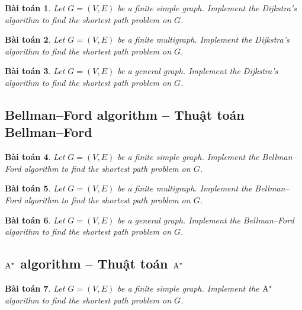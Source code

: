 \documentclass{article}
\newtheorem{baitoan}{Bài toán}
\begin{document}
\begin{baitoan}
    Let $G = (V,E)$ be a finite simple graph. Implement the Dijkstra's algorithm to find the shortest path problem on $G$.
\end{baitoan}

\begin{baitoan}
    Let $G = (V,E)$ be a finite multigraph. Implement the Dijkstra's algorithm to find the shortest path problem on $G$.
\end{baitoan}

\begin{baitoan}
    Let $G = (V,E)$ be a general graph. Implement the Dijkstra's algorithm to find the shortest path problem on $G$.
\end{baitoan}


\subsection{Bellman--Ford algorithm -- Thuật toán Bellman--Ford}

\begin{baitoan}
    Let $G = (V,E)$ be a finite simple graph. Implement the Bellman--Ford algorithm to find the shortest path problem on $G$.
\end{baitoan}

\begin{baitoan}
    Let $G = (V,E)$ be a finite multigraph. Implement the Bellman--Ford algorithm to find the shortest path problem on $G$.
\end{baitoan}

\begin{baitoan}
    Let $G = (V,E)$ be a general graph. Implement the Bellman--Ford algorithm to find the shortest path problem on $G$.
\end{baitoan}


\subsection{$\rm A^*$ algorithm -- Thuật toán $\rm A^*$}

\begin{baitoan}
    Let $G = (V,E)$ be a finite simple graph. Implement the $\rm A^*$ algorithm to find the shortest path problem on $G$.
\end{baitoan}
\end{document}
